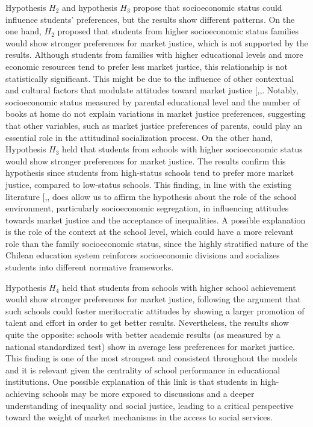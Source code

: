 \documentclass[
  12pt,
  letterpaper,
]{article}
\begin{document}
Hypothesis \(H_2\) and hypothesis \(H_3\) propose that socioeconomic
status could influence students' preferences, but the results show
different patterns. On the one hand, \(H_2\) proposed that students from
higher socioeconomic status families would show stronger preferences for
market justice, which is not supported by the results. Although students
from families with higher educational levels and more economic resources
tend to prefer less market justice, this relationship is not
statistically significant. This might be due to the influence of other
contextual and cultural factors that modulate attitudes toward market
justice
{[},,\citeproc{ref-almas_fairness_2017}{70}{]}.
Notably, socioeconomic status measured by parental educational level and
the number of books at home do not explain variations in market justice
preferences, suggesting that other variables, such as market justice
preferences of parents, could play an essential role in the attitudinal
socialization process. On the other hand, Hypothesis \(H_3\) held that
students from schools with higher socioeconomic status would show
stronger preferences for market justice. The results confirm this
hypothesis since students from high-status schools tend to prefer more
market justice, compared to low-status schools. This finding, in line
with the existing literature
{[},\citeproc{ref-jost_attitudinal_2000}{72}{]},
does allow us to affirm the hypothesis about the role of the school
environment, particularly socioeconomic segregation, in influencing
attitudes towards market justice and the acceptance of inequalities. A
possible explanation is the role of the context at the school level,
which could have a more relevant role than the family socioeconomic
status, since the highly stratified nature of the Chilean education
system reinforces socioeconomic divisions and socializes students into
different normative frameworks.

Hypothesis \(H_4\) held that students from schools with higher school
achievement would show stronger preferences for market justice,
following the argument that such schools could foster meritocratic
attitudes by showing a larger promotion of talent and effort in order to
get better results. Nevertheless, the results show quite the opposite:
schools with better academic results (as measured by a national
standardized test) show in average less preferences for market justice.
This finding is one of the most strongest and consistent throughout the
models and it is relevant given the centrality of school performance in
educational institutions. One possible explanation of this link is that
students in high-achieving schools may be more exposed to discussions
and a deeper understanding of inequality and social justice, leading to
a critical perspective toward the weight of market mechanisms in the
access to social services.
\end{document}
